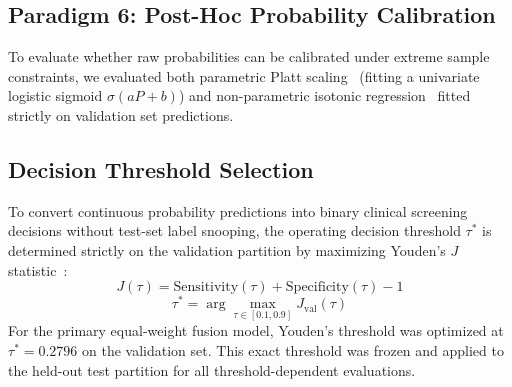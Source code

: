 \documentclass[10pt,letterpaper]{article}
\begin{document}
        \subsection*{Paradigm 6: Post-Hoc Probability Calibration}
        To evaluate whether raw probabilities can be calibrated under extreme sample constraints, we evaluated both parametric Platt scaling~\cite{ref_platt} (fitting a univariate logistic sigmoid $\sigma(a P + b)$) and non-parametric isotonic regression~\cite{ref48} fitted strictly on validation set predictions.

        \subsection*{Decision Threshold Selection}
        To convert continuous probability predictions into binary clinical screening decisions without test-set label snooping, the operating decision threshold $\tau^*$ is determined strictly on the validation partition by maximizing Youden's $J$ statistic~\cite{ref61}:
        \begin{equation} \label{eq:youden}
        J(\tau) = \text{Sensitivity}(\tau) + \text{Specificity}(\tau) - 1
        \end{equation}
        \begin{equation} \label{eq:opt_threshold}
        \tau^* = \arg\max_{\tau \in [0.1, 0.9]} J_{\text{val}}(\tau)
        \end{equation}
        For the primary equal-weight fusion model, Youden's threshold was optimized at $\tau^* = 0.2796$ on the validation set. This exact threshold was frozen and applied to the held-out test partition for all threshold-dependent evaluations.
\end{document}
